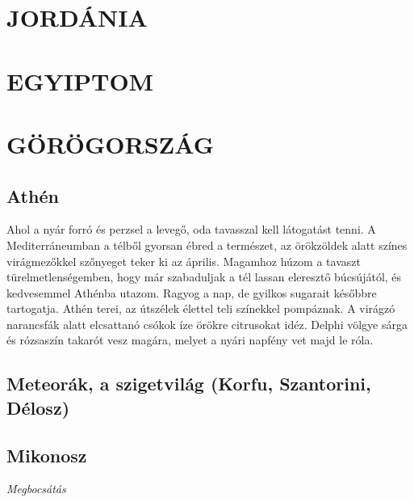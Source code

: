 \clearpage
\chapter{JORDÁNIA}

\chapter{EGYIPTOM}

\chapter{GÖRÖGORSZÁG}

\section{Athén}

Ahol a nyár forró és perzsel a levegő, oda tavasszal kell látogatást tenni.
A Mediterráneumban a télből gyorsan ébred a természet, az örökzöldek
alatt színes virágmezőkkel szőnyeget teker ki az április. Magamhoz
húzom a tavaszt türelmetlenségemben, hogy már szabaduljak a tél
lassan eleresztő búcsújától, és kedvesemmel Athénba utazom. Ragyog
a nap, de gyilkos sugarait későbbre tartogatja. Athén terei, az útszélek
élettel teli színekkel pompáznak. A virágzó narancsfák alatt elcsattanó
csókok íze örökre citrusokat idéz. Delphi völgye sárga és rózsaszín
takarót vesz magára, melyet a nyári napfény vet majd le róla.

\section{Meteorák, a szigetvilág (Korfu, Szantorini, Délosz)}

\clearpage
\section{Mikonosz}

\noindent
\textit{Megbocsátás}


